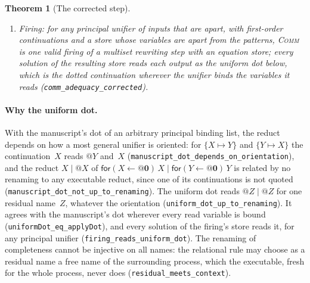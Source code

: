 \documentclass[11pt]{article}
\newtheorem{theorem}{Theorem}[section]
\theoremstyle{definition}
\theoremstyle{remark}
\begin{document}
\begin{theorem}[The corrected step]
\begin{enumerate}[nosep]
  (\texttt{cstepBag\_sound}), and on the closing fragment it is complete for
  the rules without \textsc{Refl} (\texttt{cstepBag\_complete}).  When
  \textsc{Refl} quotes the canonical representative of its reduct, the
  listener depends only on the class of the reduct
  (\texttt{reflect\_respects\_bagEq}), and the step is complete on the
  closing fragment for all four rules (\texttt{cstepCanon\_complete}).
\item \emph{Firing:} for any principal unifier of inputs that are apart,
  with first-order continuations and a store whose variables are apart
  from the patterns, \textsc{Comm} is one valid firing of a multiset
  rewriting step with an equation store; every solution of the resulting
  store reads each output as the uniform dot below, which is the dotted
  continuation wherever the unifier binds the variables it reads
  (\texttt{comm\_adequacy\_corrected}).
\end{enumerate}
\end{theorem}

\paragraph{Why the uniform dot.}
With the manuscript's dot of an arbitrary principal binding list, the
reduct depends on how a most general unifier is oriented: for
$\{X \mapsto Y\}$ and $\{Y \mapsto X\}$ the continuation~$X$ reads $@Y$
and~$X$ (\texttt{manuscript\_dot\_depends\_on\_orientation}), and the
reduct $X \mathbin{|} @X$ of
$\mathsf{for}(X \leftarrow @\mathbf{0})\,X \mathbin{|}
 \mathsf{for}(Y \leftarrow @\mathbf{0})\,Y$ is related by no renaming to
any executable reduct, since one of its continuations is not quoted
(\texttt{manuscript\_dot\_not\_up\_to\_renaming}).  The uniform dot reads
$@Z \mathbin{|} @Z$ for one residual name~$Z$, whatever the orientation
(\texttt{uniform\_dot\_up\_to\_renaming}).  It agrees with the manuscript's
dot wherever every read variable is bound (\texttt{uniformDot\_eq\_applyDot}),
and every solution of the firing's store reads it, for any principal
unifier (\texttt{firing\_reads\_uniform\_dot}).  The renaming of
completeness cannot be injective on all names: the relational rule may
choose as a residual name a free name of the surrounding process, which
the executable, fresh for the whole process, never does
(\texttt{residual\_meets\_context}).
\end{document}
